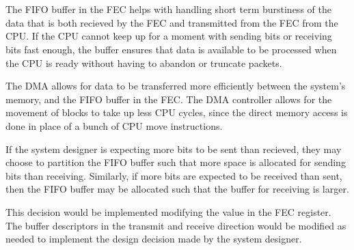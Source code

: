 \section{}

The FIFO buffer in the FEC helps with handling short term burstiness of the data
that is both recieved by the FEC and transmitted from the FEC from the CPU. If
the CPU cannot keep up for a moment with sending bits or receiving bits fast
enough, the buffer ensures that data is available to be processed when the CPU
is ready without having to abandon or truncate packets. 


The DMA allows for data to be transferred more efficiently between the system's
memory, and the FIFO buffer in the FEC. The DMA controller allows for the
movement of blocks to take up less CPU cycles, since the direct memory access is
done in place of a bunch of CPU move instructions.

If the system designer is expecting more bits to be sent than recieved, they may
choose to partition the FIFO buffer such that more space is allocated for
sending bits than receiving. Similarly, if more bits are expected to be received
than sent, then the FIFO buffer may be allocated such that the buffer for
receiving is larger. 

This decision would be implemented modifying the value in the FEC register. The
buffer descriptors in the transmit and receive direction would be modified as
needed to implement the design decision made by the system designer.


